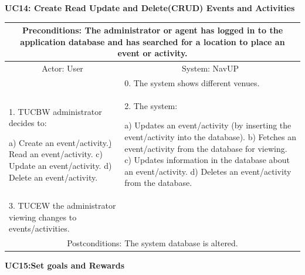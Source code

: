 ﻿\documentclass{article}
\begin{document}
     \newpage
     
				\vspace{5mm}
                \begin{flushleft}
				\textbf{UC14: Create Read Update and Delete(CRUD) Events and Activities}\\
                \end{flushleft}
        		\centering	
       		 \small
       		 \begin{tabular}{|p{6cm}|p{6cm}|}
       		 \hline
       		 \multicolumn{2}{c}{\parbox{12cm}{\vspace{2mm}Preconditions: The administrator or agent has logged in to the application database and has searched for a location to place an event or activity.\vspace{2mm}}} \\
       		 \hline
       		\multicolumn{1}{c}{Actor: User} & \multicolumn{1}{c}{ System: NavUP} \\
        		\hline
       		 & 0.	The system shows different venues.\\
       		 \hline
       		1.	TUCBW administrator decides to:

a)	Create an event/activity.\b)	Read an event/activity.
c)	Update an event/activity.
d)	Delete an event/activity.
 &2.	The system:

a)	Updates an event/activity (by inserting the event/activity into the database).
b)	Fetches an event/activity from the database for viewing.
c)	Updates information in the database about an event/activity.
d)	Deletes an event/activity from the database.
\\
        		\hline
       		3.	TUCEW the administrator viewing changes to events/activities.&\\
       		 \hline
        		\multicolumn{2}{c}{Postconditions: The system database is altered.}  \\
        		\hline
        \end{tabular} 
   \newpage
				\vspace{5mm}
                \begin{flushleft}
                \textbf{UC15:Set goals and Rewards}\\
                \end{flushleft}
        		\centering		
       		 \small
\end{document}
